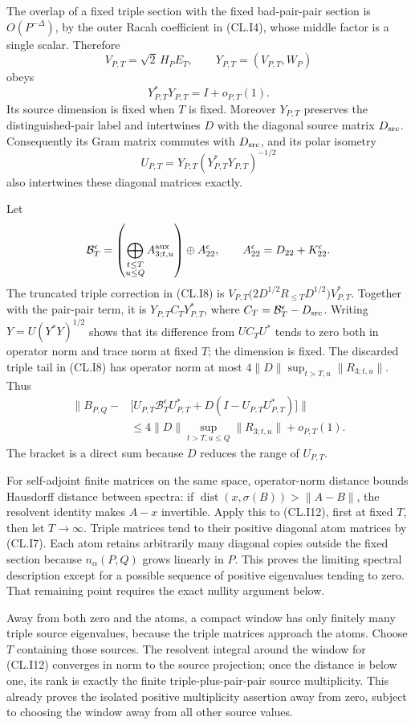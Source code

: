 \documentclass[a4paper,11pt]{article}
\numberwithin{equation}{section}
\begin{document}
The overlap of a fixed triple section with the fixed bad-pair-pair section is \(O(P^{-\Delta})\), by the outer Racah coefficient in (CL.I4), whose middle factor is a single scalar. Therefore \[
V_{P,T}=\sqrt2\,H_PE_T,\qquad
Y_{P,T}=(V_{P,T},W_P)
\] obeys \[
Y_{P,T}^*Y_{P,T}=I+o_{P,T}(1).
\tag{CL.I10}
\] Its source dimension is fixed when \(T\) is fixed. Moreover \(Y_{P,T}\) preserves the distinguished-pair label and intertwines \(D\) with the diagonal source matrix \(D_{\rm src}\). Consequently its Gram matrix commutes with \(D_{\rm src}\), and its polar isometry \[
U_{P,T}=Y_{P,T}(Y_{P,T}^*Y_{P,T})^{-1/2}
\tag{CL.I11}
\] also intertwines these diagonal matrices exactly.

Let \[
\mathcal B_T^\epsilon=
\left(\bigoplus_{\substack{t\leq T\\u\leq Q}}A_{3;t,u}^{\rm aux}\right)
\oplus A_{22}^{\epsilon},
\qquad
A_{22}^{\epsilon}=D_{22}+K_{22}^{\epsilon}.
\] The truncated triple correction in (CL.I8) is \(V_{P,T}\bigl(2D^{1/2}R_{\leq T}D^{1/2}\bigr)V_{P,T}^*\). Together with the pair-pair term, it is \(Y_{P,T}C_TY_{P,T}^*\), where \(C_T=\mathcal B_T^\epsilon-D_{\rm src}\). Writing \(Y=U(Y^*Y)^{1/2}\) shows that its difference from \(U C_TU^*\) tends to zero both in operator norm and trace norm at fixed \(T\); the dimension is fixed. The discarded triple tail in (CL.I8) has operator norm at most \(4\|D\|\sup_{t>T,u}\|R_{3;t,u}\|\). Thus \[
\begin{split}
\bigl\|B_{P,Q}
-&\bigl[U_{P,T}\mathcal B_T^\epsilon U_{P,T}^*
+D(I-U_{P,T}U_{P,T}^*)\bigr]\bigr\|\\
&\leq4\|D\|\sup_{t>T,u\leq Q}\|R_{3;t,u}\|
+o_{P,T}(1).
\end{split}
\tag{CL.I12}
\] The bracket is a direct sum because \(D\) reduces the range of \(U_{P,T}\).

For self-adjoint finite matrices on the same space, operator-norm distance bounds Hausdorff distance between spectra: if \(\operatorname{dist}(x,\sigma(B))>\|A-B\|\), the resolvent identity makes \(A-x\) invertible. Apply this to (CL.I12), first at fixed \(T\), then let \(T\to\infty\). Triple matrices tend to their positive diagonal atom matrices by (CL.I7). Each atom retains arbitrarily many diagonal copies outside the fixed section because \(n_\alpha(P,Q)\) grows linearly in \(P\). This proves the limiting spectral description except for a possible sequence of positive eigenvalues tending to zero. That remaining point requires the exact nullity argument below.

Away from both zero and the atoms, a compact window has only finitely many triple source eigenvalues, because the triple matrices approach the atoms. Choose \(T\) containing those sources. The resolvent integral around the window for (CL.I12) converges in norm to the source projection; once the distance is below one, its rank is exactly the finite triple-plus-pair-pair source multiplicity. This already proves the isolated positive multiplicity assertion away from zero, subject to choosing the window away from all other source values.
\end{document}
